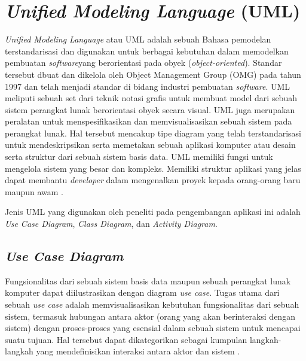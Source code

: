 \section{\emph{Unified Modeling Language} (UML)}
	\emph{Unified Modeling Language} atau UML adalah sebuah Bahasa pemodelan terstandarisasi dan digunakan untuk berbagai kebutuhan dalam memodelkan pembuatan \emph{software}yang berorientasi pada obyek (\emph{object-oriented}). Standar tersebut dbuat dan dikelola oleh Object Management Group (OMG) pada tahun 1997 dan telah menjadi standar di bidang industri pembuatan \emph{software}. UML meliputi sebuah set dari teknik notasi grafis untuk membuat model dari sebuah sistem perangkat lunak berorientasi obyek secara visual. UML juga merupakan peralatan untuk menspesifikasikan dan memvisualisasikan sebuah sistem pada perangkat lunak. Hal tersebut mencakup tipe diagram yang telah terstandarisasi untuk mendeskripsikan serta memetakan sebuah aplikasi komputer atau desain serta struktur dari sebuah sistem basis data. UML memiliki fungsi untuk mengelola sistem yang besar dan kompleks. Memiliki struktur aplikasi yang jelas dapat membantu \emph{developer} dalam mengenalkan proyek kepada orang-orang baru maupun awam \cite{lee}.
	
	Jenis UML yang digunakan oleh peneliti pada pengembangan aplikasi ini adalah \emph{Use Case Diagram}, \emph{Class Diagram}, dan \emph{Activity Diagram}.
	
	\subsection{\emph{Use Case Diagram}}
		Fungsionalitas dari sebuah sistem basis data maupun sebuah perangkat lunak komputer dapat diilustrasikan dengan diagram \emph{use case}. Tugas utama dari sebuah \emph{use case} adalah memvisualisasikan kebutuhan fungsionalitas dari sebuah sistem, termasuk hubungan antara aktor (orang yang akan berinteraksi dengan sistem) dengan proses-proses yang esensial dalam sebuah sistem untuk mencapai suatu tujuan. Hal tersebut dapat dikategorikan sebagai kumpulan langkah-langkah yang mendefinisikan interaksi antara aktor dan sistem \cite{bell}.  
		
